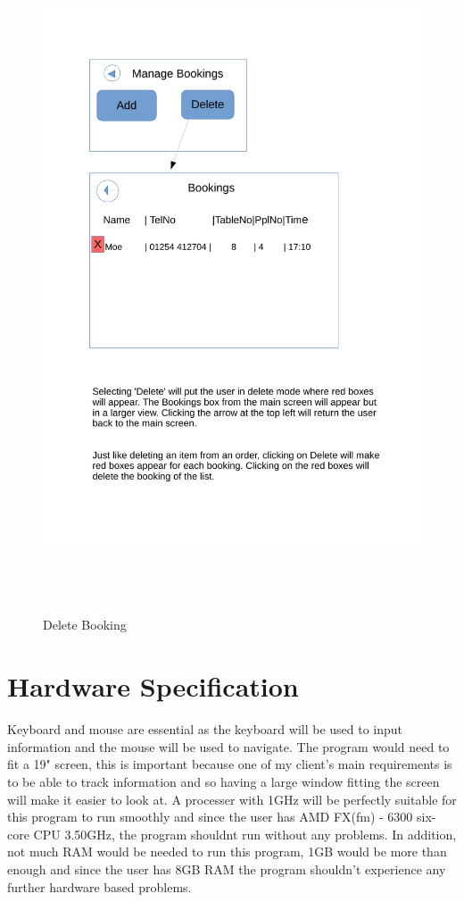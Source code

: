 \begin{figure}[H]
    \includegraphics[height = 20cm]{./Design/Images/Interface6}
    \caption{Delete Booking} \label{fig:Booking2}
\end{figure}


\section{Hardware Specification}

Keyboard and mouse are essential as the keyboard will be used to input information and the mouse will be used to navigate. The program would need to fit a 19" screen, this is important because one of my client's main requirements is to be able to track information and so having a large window fitting the screen will make it easier to look at. A processer with 1GHz will be perfectly suitable for this program to run smoothly and since the user has AMD FX(fm) - 6300 six-core CPU 3.50GHz, the program shouldnt run without any problems. In addition, not much RAM would be needed to run this program, 1GB would be more than enough and since the user has 8GB RAM the program shouldn't experience any further hardware based problems.
